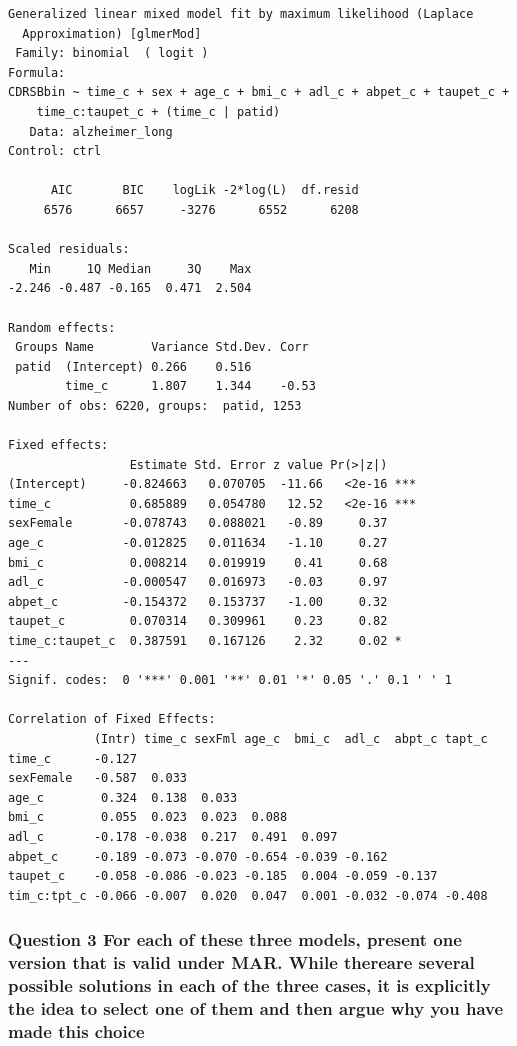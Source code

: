 \documentclass[
  11pt,
  letterpaper,
  DIV=11,
  numbers=noendperiod]{scrartcl}
\begin{document}
\begin{verbatim}
Generalized linear mixed model fit by maximum likelihood (Laplace
  Approximation) [glmerMod]
 Family: binomial  ( logit )
Formula: 
CDRSBbin ~ time_c + sex + age_c + bmi_c + adl_c + abpet_c + taupet_c +  
    time_c:taupet_c + (time_c | patid)
   Data: alzheimer_long
Control: ctrl

      AIC       BIC    logLik -2*log(L)  df.resid 
     6576      6657     -3276      6552      6208 

Scaled residuals: 
   Min     1Q Median     3Q    Max 
-2.246 -0.487 -0.165  0.471  2.504 

Random effects:
 Groups Name        Variance Std.Dev. Corr 
 patid  (Intercept) 0.266    0.516         
        time_c      1.807    1.344    -0.53
Number of obs: 6220, groups:  patid, 1253

Fixed effects:
                 Estimate Std. Error z value Pr(>|z|)    
(Intercept)     -0.824663   0.070705  -11.66   <2e-16 ***
time_c           0.685889   0.054780   12.52   <2e-16 ***
sexFemale       -0.078743   0.088021   -0.89     0.37    
age_c           -0.012825   0.011634   -1.10     0.27    
bmi_c            0.008214   0.019919    0.41     0.68    
adl_c           -0.000547   0.016973   -0.03     0.97    
abpet_c         -0.154372   0.153737   -1.00     0.32    
taupet_c         0.070314   0.309961    0.23     0.82    
time_c:taupet_c  0.387591   0.167126    2.32     0.02 *  
---
Signif. codes:  0 '***' 0.001 '**' 0.01 '*' 0.05 '.' 0.1 ' ' 1

Correlation of Fixed Effects:
            (Intr) time_c sexFml age_c  bmi_c  adl_c  abpt_c tapt_c
time_c      -0.127                                                 
sexFemale   -0.587  0.033                                          
age_c        0.324  0.138  0.033                                   
bmi_c        0.055  0.023  0.023  0.088                            
adl_c       -0.178 -0.038  0.217  0.491  0.097                     
abpet_c     -0.189 -0.073 -0.070 -0.654 -0.039 -0.162              
taupet_c    -0.058 -0.086 -0.023 -0.185  0.004 -0.059 -0.137       
tim_c:tpt_c -0.066 -0.007  0.020  0.047  0.001 -0.032 -0.074 -0.408
\end{verbatim}

\subsubsection{Question 3 For each of these three models, present one
version that is valid under MAR. While thereare several possible
solutions in each of the three cases, it is explicitly the idea to
select one of them and then argue why you have made this
choice}\label{question-3-for-each-of-these-three-models-present-one-version-that-is-valid-under-mar.-while-thereare-several-possible-solutions-in-each-of-the-three-cases-it-is-explicitly-the-idea-to-select-one-of-them-and-then-argue-why-you-have-made-this-choice}
\end{document}
